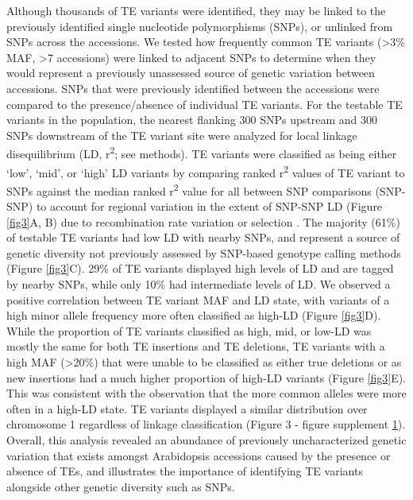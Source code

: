 \documentclass[12pt]{article}
\begin{document}
Although thousands of TE variants were identified, they may be linked
to the previously identified single nucleotide polymorphisms (SNPs),
or unlinked from SNPs across the accessions. We tested how frequently
common TE variants (\textgreater{}3\% MAF, \textgreater{}7 accessions)
were linked to adjacent SNPs to determine when they would represent a
previously unassessed source of genetic variation between accessions.
SNPs that were previously identified between the accessions
\cite{Schmitz:2013iu} were compared to the presence/absence of
individual TE variants. For the testable TE variants in the
population, the nearest flanking 300 SNPs upstream and 300 SNPs
downstream of the TE variant site were analyzed for local linkage
disequilibrium (LD, r\textsuperscript{2}; see methods). TE variants
were classified as being either `low', `mid', or `high' LD variants by
comparing ranked r\textsuperscript{2} values of TE variant to SNPs
against the median ranked r\textsuperscript{2} value for all between SNP comparisons
(SNP-SNP) to account for regional variation in the extent of SNP-SNP
LD (Figure \ref{fig3}A, B) due to recombination rate variation or
selection \cite{Horton:2012jh}. The majority (61\%) of testable TE
variants had low LD with nearby SNPs, and represent a source of
genetic diversity not previously assessed by SNP-based genotype
calling methods (Figure \ref{fig3}C).  29\% of TE variants displayed
high levels of LD and are tagged by nearby SNPs, while only 10\% had
intermediate levels of LD. We observed a positive correlation between
TE variant MAF and LD state, with variants of a high minor allele
frequency more often classified as high-LD (Figure \ref{fig3}D). While
the proportion of TE variants classified as high, mid, or low-LD was
mostly the same for both TE insertions and TE deletions, TE variants
with a high MAF (\textgreater{}20\%) that were unable to be classified
as either true deletions or as new insertions had a much higher
proportion of high-LD variants (Figure \ref{fig3}E). This was
consistent with the observation that the more common alleles were more
often in a high-LD state. TE variants displayed a similar distribution
over chromosome 1 regardless of linkage classification (Figure 3 -
figure supplement \hyperref[fig3s1]{1}). Overall, this analysis
revealed an abundance of previously uncharacterized genetic variation
that exists amongst Arabidopsis accessions caused by the presence or
absence of TEs, and illustrates the importance of identifying TE
variants alongside other genetic diversity such as SNPs.
\end{document}
